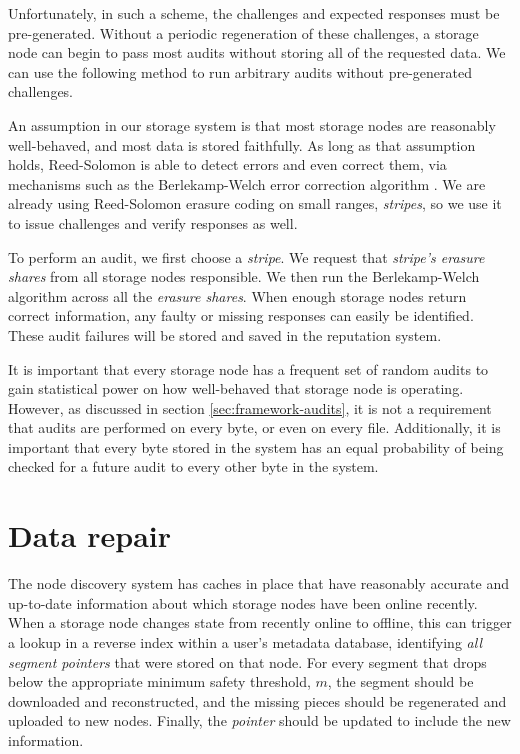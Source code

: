 \documentclass[11pt,fleqn,openany]{book}
\begin{document}
Unfortunately, in such a scheme, the challenges and expected responses must be
pre-generated. Without a periodic regeneration of these challenges, a
storage node can begin to pass most audits without storing all of the requested
data. We can use the following method to run arbitrary audits without
pre-generated challenges.

An assumption in our storage system is that most storage nodes are
reasonably well-behaved, and most data is stored faithfully. As long as that
assumption holds, Reed-Solomon is able to detect errors and even correct them,
via mechanisms such as the Berlekamp-Welch error correction algorithm \cite{bw}.
We are already using Reed-Solomon erasure coding
\cite{rs} on small ranges, {\em stripes}, so we use it to issue challenges and
verify responses as well.

To perform an audit, we first choose a {\em stripe}. We request that
{\em stripe's erasure shares} from all storage nodes responsible. We then run
the Berlekamp-Welch algorithm \cite{bw} across all the {\em erasure shares}. When
enough storage nodes return correct information, any faulty or missing responses
can easily be identified. These audit failures will be stored and saved in the
reputation system.

It is important that every storage node has a frequent set of random audits to
gain statistical power on how well-behaved that storage node is operating. However, as
discussed in section \ref{sec:framework-audits}, it is
not a requirement that audits are performed on every byte, or even on every
file.
Additionally, it is important that every byte stored in the system has an equal
probability of being checked for a future audit to every other byte in the
system.

\section{Data repair}\label{sec:concrete-data-repair}

The node discovery system has caches in place that have reasonably accurate and
up-to-date information about which storage nodes have been online recently.
When a storage node changes state from recently online to offline, this can
trigger a lookup in a reverse index within a user's metadata database, identifying
{\em all segment pointers} that were stored on that node.
For every segment that drops below the appropriate minimum safety
threshold, $m$, the segment should be downloaded and reconstructed, and the
missing pieces should be regenerated and uploaded to new nodes. Finally, the
{\em pointer} should be updated to include the new information.
\end{document}
